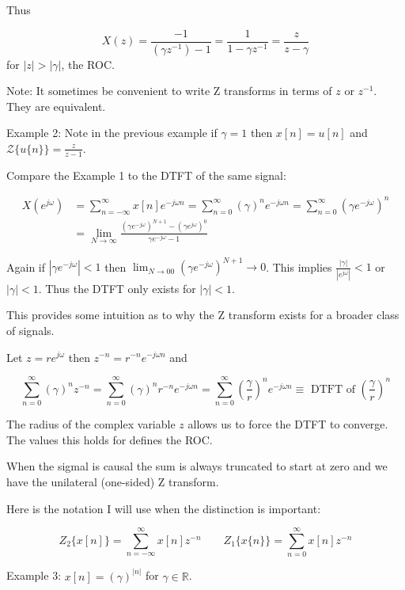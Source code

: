 \documentclass{article}
\begin{document}
Thus

$$
X(z)=\frac{-1}{\left(\gamma z^{-1}\right) - 1}=\frac{1}{1-\gamma z^{-1}}=\frac{z}{z-\gamma}
$$
for $|z|>|\gamma|$, the ROC.

Note: It sometimes be convenient to write Z transforms in terms of $z$ or $z^{-1}$. They are equivalent.

Example 2: Note in the previous example if $\gamma=1$ then $x[n]=u[n]$ and $\mathcal{Z}\{u\{n\}\}=\frac{z}{z-1}$.

Compare the Example 1 to the DTFT of the same signal:

$$
\begin{aligned}
X\left(e^{j \omega}\right) &= \sum_{n=-\infty}^{\infty} x[n] e^{-j \omega n}=\sum_{n=0}^{\infty}(\gamma)^{n} e^{-j \omega n}=\sum_{n=0}^{\infty}\left(\gamma e^{-j \omega}\right)^{n} \\
& =\lim _{N \rightarrow \infty} \frac{\left(\gamma e^{-j \omega}\right)^{N+1}-\left(\gamma e^{j \omega}\right)^{0}}{\gamma e^{-j \omega}-1}
\end{aligned}
$$

Again if $\left|\gamma e^{-j \omega}\right|<1$ then $\lim _{N \rightarrow 00}\left(\gamma e^{-j \omega}\right)^{N+1} \rightarrow 0$. This implies
$\frac{|\gamma|}{\left|e^{j \omega}\right|}<1$ or $|\gamma|<1$. Thus the DTFT only exists for $|\gamma|<1$.

This provides some intuition as to why the Z transform exists for a broader class of signals.

Let $z=r e^{j \omega}$ then $z^{-n}=r^{-n} e^{-j \omega n}$ and

$$
\sum_{n=0}^{\infty}(\gamma)^{n} z^{-n}=\sum_{n=0}^{\infty}(\gamma)^{n} r^{-n} e^{-j \omega n}=\sum_{n=0}^{\infty}\left(\frac{\gamma}{r}\right)^{n} e^{-j \omega n} \equiv \text{ DTFT of } \left(\frac{\gamma}{r}\right)^{n}
$$

The radius of the complex variable $z$ allows us to force the DTFT to converge. The values this holds for defines the ROC.

When the sigmal is causal the sum is always truncated to start at zero and we have the unilateral (one-sided) Z transform.

Here is the notation I will use when the distinction is important:

$$
Z_{2}\{x[n]\}=\sum_{n=-\infty}^{\infty} x[n] z^{-n} \qquad Z_{1}\{x\{n\}\}=\sum_{n=0}^{\infty} x[n] z^{-n}
$$

Example 3: $x[n]=(\gamma)^{|n|}$ for $\gamma\in\mathbb{R}$.
\end{document}
